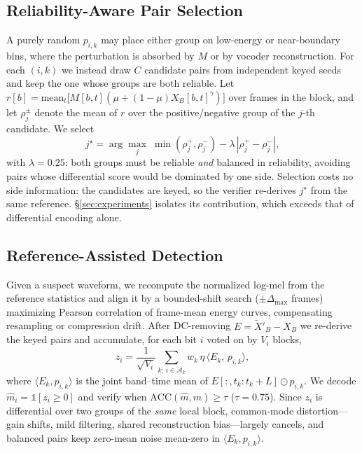 \subsection{Reliability-Aware Pair Selection}
\label{sec:method:sel}
A purely random $p_{i,k}$ may place either group on low-energy or near-boundary bins, where the perturbation is absorbed by $M$ or by vocoder reconstruction. For each $(i,k)$ we instead draw $C$ candidate pairs from independent keyed seeds and keep the one whose groups are both reliable. Let $r[b]\!=\!\mathrm{mean}_t\bigl[M[b,t](\mu\!+\!(1\!-\!\mu)X_B[b,t]^{\gamma})\bigr]$ over frames in the block, and let $\rho^{\pm}_j$ denote the mean of $r$ over the positive/negative group of the $j$-th candidate. We select
\begin{equation}
j^\star=\arg\max_j\;\min(\rho^+_j,\rho^-_j)-\lambda\,|\rho^+_j-\rho^-_j|,
\label{eq:select}
\end{equation}
with $\lambda\!=\!0.25$: both groups must be reliable \emph{and} balanced in reliability, avoiding pairs whose differential score would be dominated by one side. Selection costs no side information: the candidates are keyed, so the verifier re-derives $j^\star$ from the same reference. \S\ref{sec:experiments} isolates its contribution, which exceeds that of differential encoding alone.

\subsection{Reference-Assisted Detection}
\label{sec:method:det}
Given a suspect waveform, we recompute the normalized log-mel from the reference statistics and align it by a bounded-shift search ($\pm\Delta_{\max}$ frames) maximizing Pearson correlation of frame-mean energy curves, compensating resampling or compression drift. After DC-removing $E\!=\!\tilde X'_B\!-\!X_B$ we re-derive the keyed pairs and accumulate, for each bit $i$ voted on by $V_i$ blocks,
\begin{equation}
z_i=\frac{1}{\sqrt{V_i}}\sum_{k:\,i\in\mathcal{A}_k} w_k\,\eta\,\bigl\langle E_k,\,p_{i,k}\bigr\rangle,
\label{eq:score}
\end{equation}
where $\langle E_k,p_{i,k}\rangle$ is the joint band--time mean of $E[:,t_k\!:\!t_k\!+\!L]\odot p_{i,k}$. We decode $\hat m_i\!=\!\mathbb{1}[z_i\!\ge\!0]$ and verify when $\mathrm{ACC}(\hat m,m)\!\ge\!\tau$ ($\tau\!=\!0.75$). Since $z_i$ is differential over two groups of the \emph{same} local block, common-mode distortion---gain shifts, mild filtering, shared reconstruction bias---largely cancels, and balanced pairs keep zero-mean noise mean-zero in $\langle E_k,p_{i,k}\rangle$.

